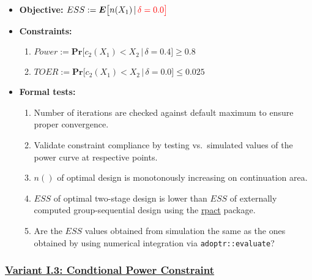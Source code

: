 \documentclass[]{book}
\providecommand{\tightlist}{%
  \setlength{\itemsep}{0pt}\setlength{\parskip}{0pt}}
\begin{document}
\begin{itemize}
\tightlist
\item
  \textbf{Objective:} \(ESS := \boldsymbol{E}\big[n(X_1)\,|\,\color{red}{\delta=0.0}\big]\)
\item
  \textbf{Constraints:}

  \begin{enumerate}
  \def\labelenumi{\arabic{enumi}.}
  \tightlist
  \item
    \(Power := \boldsymbol{Pr}\big[c_2(X_1) < X_2\,|\,\delta=0.4\big] \geq 0.8\)
  \item
    \(TOER := \boldsymbol{Pr}\big[c_2(X_1) < X_2\,|\,\delta=0.0\big] \leq 0.025\)
  \end{enumerate}
\item
  \textbf{Formal tests:}

  \begin{enumerate}
  \def\labelenumi{\arabic{enumi}.}
  \tightlist
  \item
    Number of iterations are checked against default maximum to ensure proper
    convergence.
  \item
    Validate constraint compliance by testing vs.~simulated
    values of the power curve at respective points.
  \item
    \(n()\) of optimal design is monotonously increasing on continuation area.
  \item
    \(ESS\) of optimal two-stage design is lower than \(ESS\) of externally
    computed group-sequential design using the \href{https://rpact.org/}{rpact} package.
  \item
    Are the \(ESS\) values obtained from simulation the same as the ones
    obtained by using numerical integration via \texttt{adoptr::evaluate}?
  \end{enumerate}
\end{itemize}

\hypertarget{variant-i.3-condtional-power-constraint}{%
\subsubsection{\texorpdfstring{\protect\hyperlink{variantI_3}{Variant I.3: Condtional Power Constraint}}{Variant I.3: Condtional Power Constraint}}\label{variant-i.3-condtional-power-constraint}}
\end{document}
